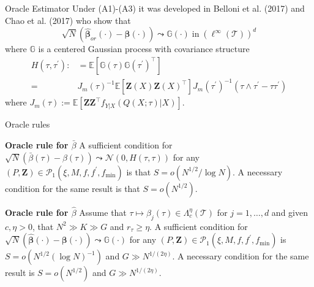 \documentclass[11pt]{beamer}
\begin{document}
\begin{frame}{Oracle Estimator }
Under (A1)-(A3) it was developed in Belloni et al. (2017)
and Chao et al. (2017) who show that
$$
\sqrt{N}\left(\widehat{\boldsymbol{\beta}}_{o r}(\cdot)-\boldsymbol{\beta}(\cdot)\right) \leadsto \mathbb{G}(\cdot) \operatorname{in}\left(\ell^{\infty}(\mathcal{T})\right)^{d}
$$
where $\mathbb{G}$ is a centered Gaussian process with covariance structure
$$
\begin{aligned}
H\left(\tau, \tau^{\prime}\right):&=\mathbb{E}\left[\mathbb{G}(\tau) \mathbb{G}\left(\tau^{\prime}\right)^{\top}\right]  \\
=& J_{m}(\tau)^{-1} \mathbb{E}\left[\mathbf{Z}(X) \mathbf{Z}(X)^{\top}\right] J_{m}\left(\tau^{\prime}\right)^{-1}\left(\tau \wedge \tau^{\prime}-\tau \tau^{\prime}\right)
\end{aligned}
$$
where $J_{m}(\tau):=\mathbb{E}\left[\mathbf{Z Z}^{\top} f_{Y | X}(Q(X ; \tau) | X)\right]$.
\end{frame}
\begin{frame}{Oracle rules }

{\bf Oracle rule for $\bar{\beta}$}
 A sufficient condition for
$\sqrt{N}(\bar{\beta}(\tau)-\beta(\tau))\leadsto \mathcal{N}(0, H(\tau, \tau))$ for any $(P, \mathbf{Z}) \in \mathcal{P}_{1}\left(\xi, M, f, f^{\prime}, f_{\min }\right) $ is that $S=o(N^{1/2}/\log N)$.  A necessary condition for the same result is that $S=o(N^{1/2})$. 

{\bf Oracle rule for $\hat{\beta}$}
Assume that $\tau \mapsto \beta_{j}(\tau) \in \Lambda_{c}^{\eta}(\mathcal{T})$ for $j=1,\dots,d$ and given $c,\eta>0$, that $N^2\gg K \gg G$ and $r_{\tau}\ge \eta$.  A sufficient condition for $\sqrt{N}(\hat{\boldsymbol{\beta}}(\cdot)-\boldsymbol{\beta}(\cdot)) \leadsto \mathbb{G}(\cdot)$ for any $(P, \mathbf{Z}) \in \mathcal{P}_{1}\left(\xi, M, f, f^{\prime}, f_{\min }\right) $ is
$S=o\left(N^{1 / 2}(\log N)^{-1}\right)$ and $G\gg N^{1/(2\eta)}$. 
A
necessary condition for the same result is $S=o(N^{1/2})$ and $G\gg N^{1/(2\eta)}$.
 
\end{frame}
\end{document}
